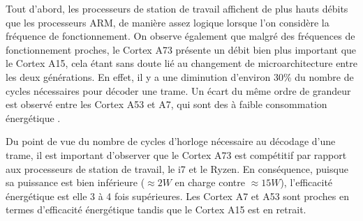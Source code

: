 Tout d'abord, les processeurs de station de travail affichent de plus hauts débits que les processeurs ARM, de manière assez logique lorsque l'on considère la fréquence de fonctionnement. On observe également que malgré des fréquences de fonctionnement proches, le Cortex A73 présente un débit bien plus important que le Cortex A15, cela étant sans doute lié au changement de microarchitecture entre les deux générations. En effet, il y a une diminution d'environ 30\% du nombre de cycles nécessaires pour décoder une trame. Un écart du même ordre de grandeur est observé entre les Cortex A53 et A7, qui sont des \coeurs à faible consommation énergétique  .

Du point de vue du nombre de cycles d'horloge nécessaire au décodage d'une trame, il est important d'observer que le Cortex A73 est compétitif par rapport aux processeurs de station de travail, le i7 et le Ryzen. En conséquence, puisque sa puissance est bien inférieure ($\approx 2 W$ en charge contre $\approx 15 W$), l'efficacité énergétique est elle 3 à 4 fois supérieures. Les Cortex A7 et A53 sont proches en termes d'efficacité énergétique tandis que le Cortex A15 est en retrait.


